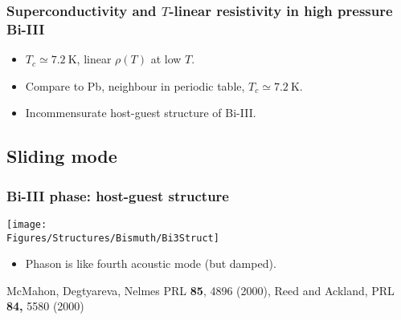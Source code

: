 \begin{frame}[label=BiSuper1]
\frametitle{Superconductivity and $T$-linear resistivity in high pressure Bi-III}
\centerline{}

\begin{itemize}
\item $T_c \simeq 7.2 ~ \text{K}$, linear $\rho(T)$ at low $T$.
\item Compare to Pb, neighbour in periodic table, $T_c \simeq 7.2~\text{K}$.
\item<visible@2-> Incommensurate host-guest structure of Bi-III.

\end{itemize}

\vspace*{\fill}
\centerline{\makebox[\linewidth]{\rule{0.85\textwidth}{0.4pt}}}
\centerline{}
\end{frame}

\subsection{Sliding mode}
\begin{frame}[label=BiIntro]
\frametitle{Bi-III phase: host-guest structure}
\centerline{\texttt{[image: \\Figures/Structures/Bismuth/Bi3Struct]}}


\begin{itemize}
\item <visible@2->Phason is like fourth acoustic mode (but damped).

\end{itemize}

\vspace*{\fill}
\vspace{1.5em}
\centerline{\makebox[\linewidth]{\rule{0.85\textwidth}{0.4pt}}}
\centerline{\scriptsize McMahon, Degtyareva, Nelmes PRL {\bf 85}, 4896
  (2000), Reed and Ackland, PRL {\bf 84,} 5580 (2000)}
\end{frame}


